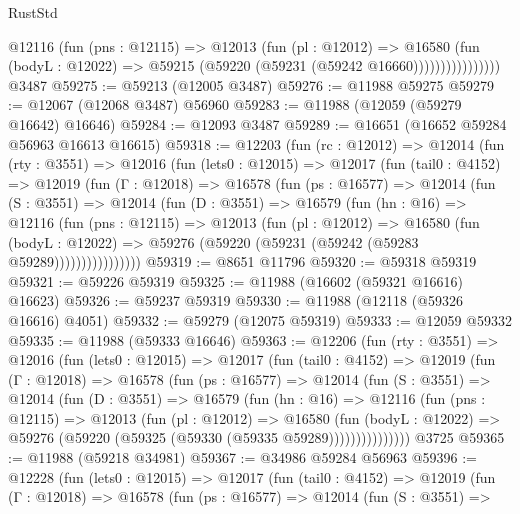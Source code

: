 \begin{lexlean}{RustStd}
\begin{coremodule}
                      @12116
                        (fun (pns : @12115) =>
                        @12013
                          (fun (pl : @12012) =>
                          @16580
                            (fun (bodyL : @12022) =>
                            @59215 (@59220 (@59231 (@59242 @16660))))))))))))))))
    @3487
@59275 := @59213 (@12005 @3487)
@59276 := @11988 @59275
@59279 := @12067 (@12068 @3487) @56960
@59283 := @11988 (@12059 (@59279 @16642) @16646)
@59284 := @12093 @3487
@59289 := @16651 (@16652 @59284 @56963 @16613 @16615)
@59318 := @12203
    (fun (rc : @12012) =>
    @12014
      (fun (rty : @3551) =>
      @12016
        (fun (lets0 : @12015) =>
        @12017
          (fun (tail0 : @4152) =>
          @12019
            (fun (Γ : @12018) =>
            @16578
              (fun (ps : @16577) =>
              @12014
                (fun (S : @3551) =>
                @12014
                  (fun (D : @3551) =>
                  @16579
                    (fun (hn : @16) =>
                    @12116
                      (fun (pns : @12115) =>
                      @12013
                        (fun (pl : @12012) =>
                        @16580
                          (fun (bodyL : @12022) =>
                          @59276 (@59220 (@59231 (@59242 (@59283 @59289))))))))))))))))
@59319 := @8651 @11796
@59320 := @59318 @59319
@59321 := @59226 @59319
@59325 := @11988 (@16602 (@59321 @16616) @16623)
@59326 := @59237 @59319
@59330 := @11988 (@12118 (@59326 @16616) @4051)
@59332 := @59279 (@12075 @59319)
@59333 := @12059 @59332
@59335 := @11988 (@59333 @16646)
@59363 := @12206
    (fun (rty : @3551) =>
    @12016
      (fun (lets0 : @12015) =>
      @12017
        (fun (tail0 : @4152) =>
        @12019
          (fun (Γ : @12018) =>
          @16578
            (fun (ps : @16577) =>
            @12014
              (fun (S : @3551) =>
              @12014
                (fun (D : @3551) =>
                @16579
                  (fun (hn : @16) =>
                  @12116
                    (fun (pns : @12115) =>
                    @12013
                      (fun (pl : @12012) =>
                      @16580
                        (fun (bodyL : @12022) =>
                        @59276 (@59220 (@59325 (@59330 (@59335 @59289)))))))))))))))
    @3725
@59365 := @11988 (@59218 @34981)
@59367 := @34986 @59284 @56963
@59396 := @12228
    (fun (lets0 : @12015) =>
    @12017
      (fun (tail0 : @4152) =>
      @12019
        (fun (Γ : @12018) =>
        @16578
          (fun (ps : @16577) =>
          @12014
            (fun (S : @3551) =>

\end{coremodule}
\end{lexlean}
